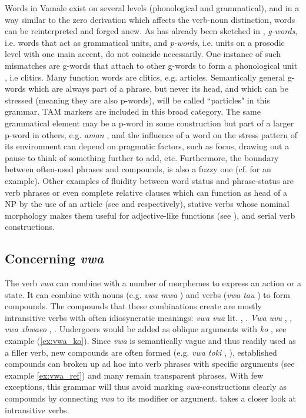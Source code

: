 Words in Vamale exist on several levels (phonological and grammatical), and in a way similar to the zero derivation which affects the verb-noun distinction, words can be reinterpreted and forged anew. As has already been sketched in , \textit{g-words}, i.e. words that act as grammatical units, and \textit{p-words}, i.e. units on a prosodic level with one main accent, do not coincide necessarily. One instance of such mismatches are g-words that attach to other g-words to form a phonological unit \parencite[1]{spencer_clitics_2012}, i.e clitics. Many function words are clitics, e.g. articles. Semantically general g-words which are always part of a phrase, but never its head, and which can be stressed (meaning they are also p-words), will be called ``particles" in this grammar. TAM markers are included in this broad category. The same grammatical element may be a p-word in some construction but part of a larger p-word in others, e.g. \textit{aman} , and the influence of a word on the stress pattern of its environment can depend on pragmatic factors, such as focus, drawing out a pause to think of something further to add, etc. Furthermore, the boundary between often-used phrases and compounds, is also a fuzzy one (cf.  for an example). Other examples of fluidity between word status and phrase-status are verb phrases or even complete relative clauses which can function as head of a NP by the use of an article (see  and  respectively), stative verbs whose nominal morphology makes them useful for adjective-like functions (see ), and serial verb constructions. 

\subsection{Concerning \textit{vwa}}
\label{ssec:vwa}

The verb \textit{vwa}  can combine with a number of morphemes to express an action or a state. It can combine with nouns (e.g. \textit{vwa mwa} ) and verbs (\textit{vwa tau} ) to form compounds.
The compounds that these combinations create are mostly intransitive verbs with often idiosyncratic meanings: \textit{vwa vua} lit. , . \textit{Vwa uvu} , , \textit{vwa xhwaeo} , . Undergoers would be added as oblique arguments with \textit{ko} , see example (\ref{ex:vwa_ko}). Since \textit{vwa} is semantically vague and thus readily used as a filler verb, new compounds are often formed (e.g. \textit{vwa toki} , ), established compounds can broken up ad hoc into verb phrases with specific arguments (see example \ref{ex:vwa_ref}) and many remain transparent phrases. With few exceptions, this grammar will thus avoid marking \textit{vwa}-constructions clearly as compounds by connecting \textit{vwa} to its modifier or argument.  takes a closer look at intransitive verbs.

